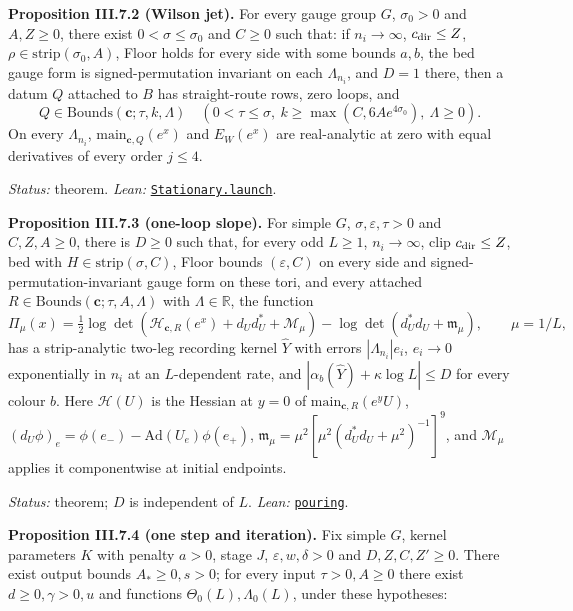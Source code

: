 \documentclass[
  letterpaper,
  11pt]{article}
\begin{document}
\textbf{Proposition III.7.2 (Wilson jet).} For every gauge group \(G\),
\(\sigma_0>0\) and \(A,Z\ge0\), there exist \(0<\sigma\le\sigma_0\) and
\(C\ge0\) such that: if \(n_i\to\infty\), \(c_{\rm dir}\le Z\),
\(\rho\in\mathrm{strip}(\sigma_0,A)\), Floor holds for every side with
some bounds \(a,b\), the bed gauge form is signed-permutation invariant
on each \(\Lambda_{n_i}\), and \(D=1\) there, then a datum \(Q\)
attached to \(B\) has straight-route rows, zero loops, and
\[Q\in\mathrm{Bounds}(\mathbf c;\tau,k,\Lambda)\quad(0<\tau\le\sigma,\ k\ge\max(C,6Ae^{4\sigma_0}),\ \Lambda\ge0).\]
On every \(\Lambda_{n_i}\), \(\mathrm{main}_{\mathbf c,Q}(e^x)\) and
\(E_W(e^x)\) are real-analytic at zero with equal derivatives of every
order \(j\le4\).

\emph{Status:} theorem. \emph{Lean:}
\href{https://github.com/yang-mills-group/OpenAI-YM-20261028/blob/3456e5e75cf8d4cd558955a5c7638fba2d68f464/YM/Next/STATIONARY/Shape/Scaled.lean\#L270-L305}{\texttt{Stationary.launch}}.

\textbf{Proposition III.7.3 (one-loop slope).} For simple \(G\),
\(\sigma,\varepsilon,\tau>0\) and \(C,Z,A\ge0\), there is \(D\ge0\) such
that, for every odd \(L\ge1\), \(n_i\to\infty\), clip
\(c_{\rm dir}\le Z\), bed with \(H\in\mathrm{strip}(\sigma,C)\), Floor
bounds \((\varepsilon,C)\) on every side and
signed-permutation-invariant gauge form on these tori, and every
attached \(R\in\mathrm{Bounds}(\mathbf c;\tau,A,\Lambda)\) with
\(\Lambda\in\mathbb R\), the function
\[\Pi_\mu(x)=\tfrac12\log\det(\mathcal H_{\mathbf c,R}(e^x)+d_Ud_U^*+\mathcal M_\mu)-\log\det(d_U^*d_U+\mathfrak m_\mu),\qquad\mu=1/L,\]
has a strip-analytic two-leg recording kernel \(\hat Y\) with errors
\(|\Lambda_{n_i}|e_i\), \(e_i\to0\) exponentially in \(n_i\) at an
\(L\)-dependent rate, and \(|\alpha_b(\hat Y)+\kappa\log L|\le D\) for
every colour \(b\). Here \(\mathcal H(U)\) is the Hessian at \(y=0\) of
\(\mathrm{main}_{\mathbf c,R}(e^yU)\),
\((d_U\phi)_e=\phi(e_-)-\mathrm{Ad}(U_e)\phi(e_+)\),
\(\mathfrak m_\mu=\mu^2[\mu^2(d_U^*d_U+\mu^2)^{-1}]^9\), and
\(\mathcal M_\mu\) applies it componentwise at initial endpoints.

\emph{Status:} theorem; \(D\) is independent of \(L\). \emph{Lean:}
\href{https://github.com/yang-mills-group/OpenAI-YM-20261028/blob/3456e5e75cf8d4cd558955a5c7638fba2d68f464/YM/Next/STATIONARY/FullPlanned.lean\#L17-L52}{\texttt{pouring}}.

\textbf{Proposition III.7.4 (one step and iteration).} Fix simple \(G\),
kernel parameters \(K\) with penalty \(a>0\), stage \(J\),
\(\varepsilon,w,\delta>0\) and \(D,Z,C,Z'\ge0\). There exist output
bounds \(A_*\ge0,s>0\); for every input \(\tau>0,A\ge0\) there exist
\(d\ge0,\gamma>0,u\) and functions \(\Theta_0(L),\Lambda_0(L)\), under
these hypotheses:
\end{document}
